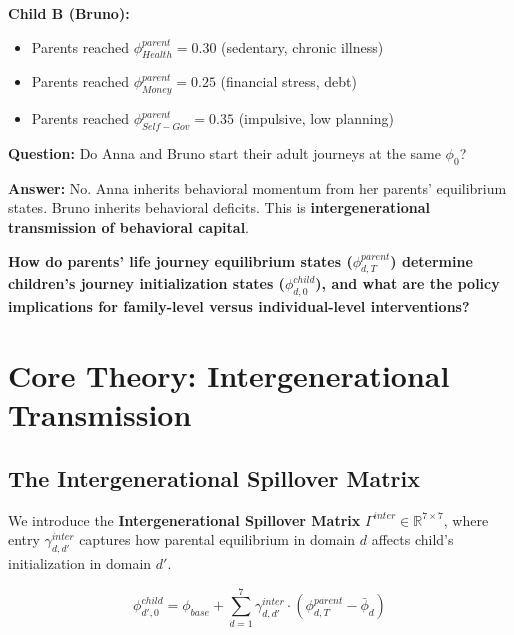 \textbf{Child B (Bruno):}
\begin{itemize}[nosep]
\item Parents reached $\phi_{Health}^{parent} = 0.30$ (sedentary, chronic illness)
\item Parents reached $\phi_{Money}^{parent} = 0.25$ (financial stress, debt)
\item Parents reached $\phi_{Self-Gov}^{parent} = 0.35$ (impulsive, low planning)
\end{itemize}

\textbf{Question:} Do Anna and Bruno start their adult journeys at the same $\phi_0$?

\textbf{Answer:} No. Anna inherits behavioral momentum from her parents' equilibrium states.
Bruno inherits behavioral deficits. This is \textbf{intergenerational transmission of behavioral capital}.

\begin{tcolorbox}[colback=red!5!white, colframe=red!75!black,
    title=The Fundamental Question]
\textbf{How do parents' life journey equilibrium states ($\phi^{parent}_{d,T}$) determine
children's journey initialization states ($\phi^{child}_{d,0}$), and what are the policy
implications for family-level versus individual-level interventions?}
\end{tcolorbox}


\section{Core Theory: Intergenerational Transmission}
\label{sec:BI-theory}

\subsection{The Intergenerational Spillover Matrix}

We introduce the \textbf{Intergenerational Spillover Matrix} $\Gamma^{inter} \in \mathbb{R}^{7 \times 7}$,
where entry $\gamma^{inter}_{d,d'}$ captures how parental equilibrium in domain $d$ affects
child's initialization in domain $d'$.

\begin{equation}
\phi^{child}_{d',0} = \phi_{base} + \sum_{d=1}^{7} \gamma^{inter}_{d,d'} \cdot \left(\phi^{parent}_{d,T} - \bar{\phi}_d\right)
\end{equation}

